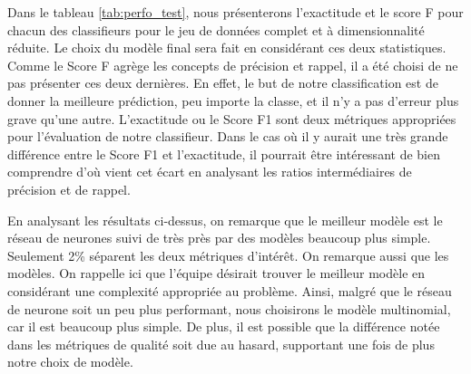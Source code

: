 Dans le tableau \ref{tab:perfo_test}, nous présenterons l'exactitude et le score F pour chacun des classifieurs pour le jeu de données complet et à dimensionnalité réduite. Le choix du modèle final sera fait en considérant ces deux statistiques. \\

Comme le Score F agrège les concepts de précision et rappel, il a été choisi de ne pas présenter ces deux dernières. En effet, le but de notre classification est de donner la meilleure prédiction, peu importe la classe, et il n'y a pas d'erreur plus grave qu'une autre. L'exactitude ou le Score F1 sont deux métriques appropriées pour l'évaluation de notre classifieur. Dans le cas où il y aurait une très grande différence entre le Score F1 et l'exactitude, il pourrait être intéressant de bien comprendre d'où vient cet écart en analysant les ratios intermédiaires de précision et de rappel.

\begin{table}[H]
	
\caption{\label{tab:}Performances des différents modèles sur le jeu de données de test selon les différentes mesures de performance.}
\centering
{}

\end{table}

En analysant les résultats ci-dessus, on remarque que le meilleur modèle est le réseau de neurones suivi de très près par des modèles beaucoup plus simple. Seulement 2\% séparent les deux métriques d'intérêt. On remarque aussi que les modèles. On rappelle ici que l'équipe désirait trouver le meilleur modèle en considérant une complexité appropriée au problème. Ainsi, malgré que le réseau de neurone soit un peu plus performant, nous choisirons le modèle multinomial, car il est beaucoup plus simple. De plus, il est possible que la différence notée dans les métriques de qualité soit due au hasard, supportant une fois de plus notre choix de modèle. 
 
